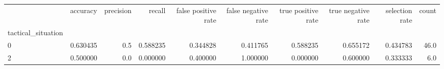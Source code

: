 \begin{tabular}{lrrrrrrrrr}
\toprule
{} &  accuracy &  precision &    recall &  false positive rate &  false negative rate &  true positive rate &  true negative rate &  selection rate &  count \\
tactical\_situation &           &            &           &                      &                      &                     &                     &                 &        \\
\midrule
0                  &  0.630435 &        0.5 &  0.588235 &             0.344828 &             0.411765 &            0.588235 &            0.655172 &        0.434783 &   46.0 \\
2                  &  0.500000 &        0.0 &  0.000000 &             0.400000 &             1.000000 &            0.000000 &            0.600000 &        0.333333 &    6.0 \\
\bottomrule
\end{tabular}
